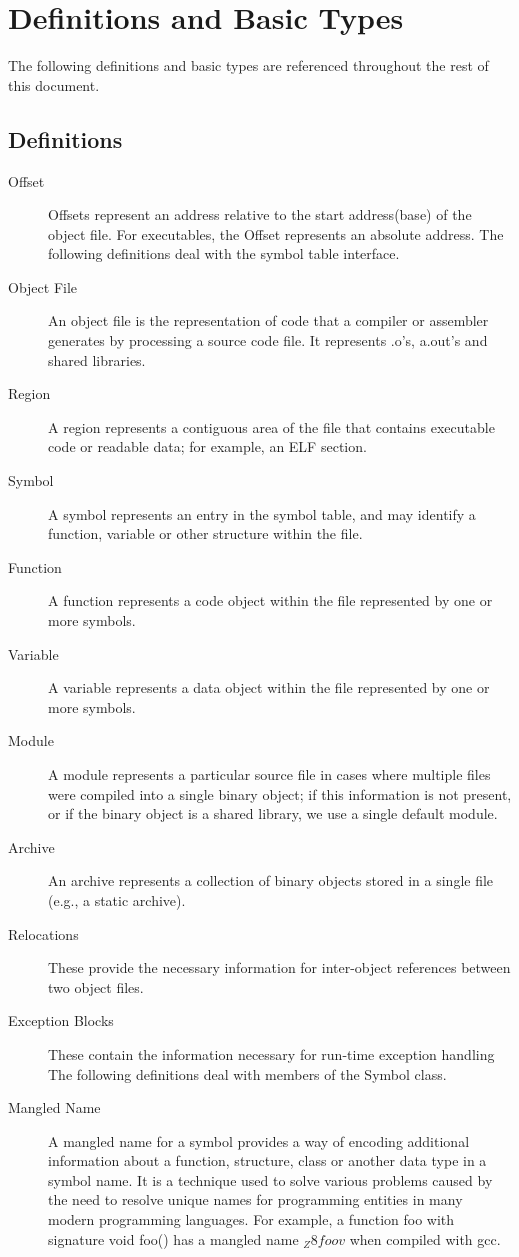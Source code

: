 \section{Definitions and Basic Types}

The following definitions and basic types are referenced throughout the rest of this document.

\subsection{Definitions}

\begin{description}
\item[Offset] Offsets represent an address relative to the start address(base) of the object file. For executables, the Offset represents an absolute address.
The following definitions deal with the symbol table interface.
\item[Object File] An object file is the representation of code that a compiler or assembler generates by processing a source code file. It represents .o's, a.out's and shared libraries.
\item[Region] A region represents a contiguous area of the file that contains executable code or readable data; for example, an ELF section.
\item[Symbol] A symbol represents an entry in the symbol table, and may identify a function, variable or other structure within the file.
\item[Function] A function represents a code object within the file represented by one or more symbols.
\item[Variable] A variable represents a data object within the file represented by one or more symbols.
\item[Module] A module represents a particular source file in cases where multiple files were compiled into a single binary object; if this information is not present, or if the binary object is a shared library, we use a single default module.
\item[Archive] An archive represents a collection of binary objects stored in a single file (e.g., a static archive). 
\item[Relocations] These provide the necessary information for inter-object references between two object files.
\item[Exception Blocks] These contain the information necessary for run-time exception handling
The following definitions deal with members of the Symbol class.
\item[Mangled Name] A mangled name for a symbol provides a way of encoding additional information about a function, structure, class or another data type in a symbol name. It is a technique used to solve various problems caused by the need to resolve unique names for programming entities in many modern programming languages. For example, a function foo with signature void foo() has a mangled name $_Z8foov$ when compiled with gcc.

\end{description}
